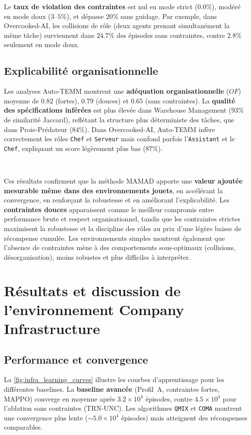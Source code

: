 Le \textbf{taux de violation des contraintes} est nul en mode strict ($0.0\%$), modéré en mode doux ($3$–$5\%$), et dépasse $20\%$ sans guidage.
Par exemple, dans Overcooked-AI, les collisions de rôle (deux agents prenant simultanément la même tâche) surviennent dans $24.7\%$ des épisodes sans contraintes, contre $2.8\%$ seulement en mode doux.

\subsection*{Explicabilité organisationnelle}

Les analyses Auto-TEMM montrent une \textbf{adéquation organisationnelle} ($OF$) moyenne de $0.82$ (fortes), $0.79$ (douces) et $0.65$ (sans contraintes).
La \textbf{qualité des spécifications inférées} est plus élevée dans Warehouse Management ($93\%$ de similarité Jaccard), reflétant la structure plus déterministe des tâches, que dans Proie-Prédateur ($84\%$).
Dans Overcooked-AI, Auto-TEMM infère correctement les rôles \texttt{Chef} et \texttt{Serveur} mais confond parfois l’\texttt{Assistant} et le \texttt{Chef}, expliquant un score légèrement plus bas ($87\%$).

\

Ces résultats confirment que la méthode MAMAD apporte une \textbf{valeur ajoutée mesurable même dans des environnements jouets}, en accélérant la convergence, en renforçant la robustesse et en améliorant l’explicabilité.
Les \textbf{contraintes douces} apparaissent comme le meilleur compromis entre performance brute et respect organisationnel, tandis que les contraintes strictes maximisent la robustesse et la discipline des rôles au prix d’une légère baisse de récompense cumulée.
Les environnements simples montrent également que l’absence de contraintes mène à des comportements sous-optimaux (collisions, désorganisation), moins robustes et plus difficiles à interpréter.


\section{Résultats et discussion de l'environnement \textbf{Company Infrastructure}}\label{sec:results_and_discussion_infra}

\subsection*{Performance et convergence}

La \autoref{fig:infra_learning_curves} illustre les courbes d'apprentissage pour les différentes baselines.
La \textbf{baseline avancée} (Profil~A, contraintes fortes, MAPPO) converge en moyenne après $3.2 \times 10^4$ épisodes, contre $4.5 \times 10^4$ pour l'ablation sans contraintes (TRN-UNC).
Les algorithmes \texttt{QMIX} et \texttt{COMA} montrent une convergence plus lente ($\sim 5.0 \times 10^4$ épisodes) mais atteignent des récompenses comparables.

